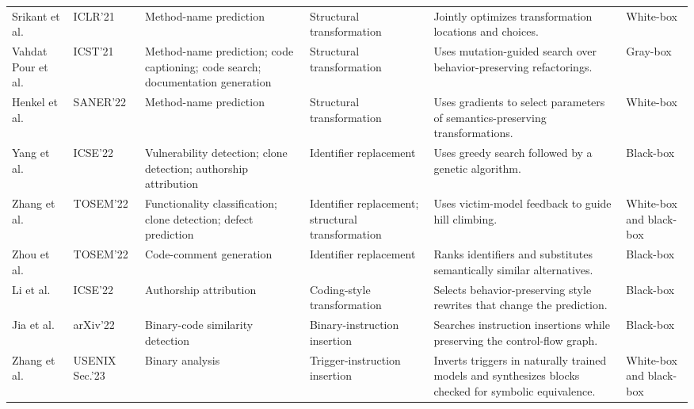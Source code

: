 \documentclass[acmsmall,screen,review,nonacm]{acmart}
\begin{document}
{\begin{longtable}{@{}L{2.1cm}L{1.5cm}L{2.30cm}L{2.50cm}L{3.50cm}L{1.35cm}@{}}
Srikant et al.~\cite{srikant2021generating} &
ICLR'21 &
Method-name prediction &
Structural transformation &
Jointly optimizes transformation locations and choices. &
White-box \\

Vahdat Pour et al.~\cite{vahdatpour2021search} &
ICST'21 &
Method-name prediction; code captioning; code search; documentation generation &
Structural transformation &
Uses mutation-guided search over behavior-preserving refactorings. &
Gray-box \\

Henkel et al.~\cite{ramakrishnan2022semantic} &
SANER\allowbreak'22 &
Method-name prediction &
Structural transformation &
Uses gradients to select parameters of semantics-preserving transformations. &
White-box \\

Yang et al.~\cite{yang2022natural} &
ICSE'22 &
Vulnerability detection; clone detection; authorship attribution &
Identifier replacement &
Uses greedy search followed by a genetic algorithm. &
Black-box \\

Zhang et al.~\cite{zhang2022carrot} &
TOSEM\allowbreak'22 &
Functionality classification; clone detection; defect prediction &
Identifier replacement; structural transformation &
Uses victim-model feedback to guide hill climbing. &
White-box and black-box \\

Zhou et al.~\cite{zhou2022accent} &
TOSEM\allowbreak'22 &
Code-comment generation &
Identifier replacement &
Ranks identifiers and substitutes semantically similar alternatives. &
Black-box \\

Li et al.~\cite{li2022ropgen} &
ICSE'22 &
Authorship attribution &
Coding-style transformation &
Selects behavior-preserving style rewrites that change the prediction. &
Black-box \\

Jia et al.~\cite{funcfooler2022} &
arXiv'22 &
Binary-code similarity detection &
Binary-instruction insertion &
Searches instruction insertions while preserving the control-flow graph. &
Black-box \\

Zhang et al.~\cite{pelican2023} &
USENIX Sec.'23 &
Binary analysis &
Trigger-instruction insertion &
Inverts triggers in naturally trained models and synthesizes blocks checked for symbolic equivalence. &
White-box and black-box \\


\end{longtable}}
\end{document}
